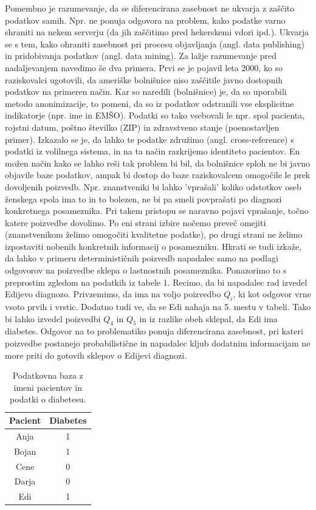 \documentclass[12pt,a4paper]{amsart}
\theoremstyle{definition} %
\theoremstyle{plain} %
\begin{document}
Pomembno je razumevanje, da se diferencirana zasebnost ne ukvarja z zaščito podatkov samih. Npr. ne ponuja odgovora na problem, kako podatke varno shraniti na nekem serverju (da jih zaščitimo pred hekerskemi vdori ipd.). Ukvarja se s tem, kako ohraniti zasebnost pri procesu objavljanja (angl. data publishing) in pridobivanja podatkov (angl. data mining). Za lažje razumevanje pred nadaljevanjem navedimo še dva primera. Prvi se je pojavil leta 2000, ko so raziskovalci ugotovili, da ameriške bolnišnice niso zaščitile javno dostopnih podatkov na primeren način. Kar so naredili (bolnišnice) je, da so uporabili metodo anonimizacije, to pomeni, da so iz podatkov odstranili vse eksplicitne indikatorje (npr. ime in EMŠO). Podatki so tako vsebovali le npr. spol pacienta, rojstni datum, poštno številko (ZIP) in zdravstveno stanje (poenostavljen primer). Izkazalo se je, da lahko te podatke združimo (angl. cross-reference) s podatki iz volilnega sistema, in na ta način razkrijemo identiteto pacientov. En možen način kako se lahko reši tak problem bi bil, da bolnišnice sploh ne bi javno objavile baze podatkov, ampak bi dostop do baze raziskovalcem omogočile le prek dovoljenih poizvedb. Npr. znanstveniki bi lahko 'vprašali' koliko odstotkov oseb ženskega spola ima to in to bolezen, ne bi pa smeli povprašati po diagnozi konkretnega posameznika. Pri takem pristopu se naravno pojavi vprašanje, točno katere poizvedbe dovolimo. Po eni strani izbire nočemo preveč omejiti (znanstvenikom želimo omogočiti kvalitetne podatke), po drugi strani ne želimo izpostaviti nobenih konkretnih informacij o posamezniku. Hkrati se tudi izkaže, da lahko v primeru determinističnih poizvedb napadalec samo na podlagi odgovorov na poizvedbe sklepa o lastnostnih posameznika. Ponazorimo to s preprostim zgledom na podatkih iz tabele 1. Recimo, da bi napadalec rad izvedel Edijevo diagnozo. Privzemimo, da ima na voljo poizvedbo $Q_i$, ki kot odgovor vrne vsoto prvih i vrstic. Dodatno tudi ve, da se Edi nahaja na 5. mestu v tabeli. Tako bi lahko izvedel poizvedbi $Q_4$ in $Q_5$ in iz razlike obeh sklepal, da Edi ima diabetes.  Odgovor na to problematiko ponuja diferencirana zasebnost, pri kateri poizvedbe postanejo probabilistične in napadalec kljub dodatnim informacijam ne more priti do gotovih sklepov o Edijevi diagnozi.
\begin{table}
\begin{center}
 \begin{tabular}{| c | c |} 
 \hline
 \textbf{Pacient} & \textbf{Diabetes}  \\ [0.5ex] 
 \hline
 Anja & 1  \\ 
 \hline
 Bojan & 1\\
 \hline
 Cene & 0 \\
 \hline
 Darja & 0  \\
 \hline
 Edi & 1  \\  
 \hline
\end{tabular}
\caption{Podatkovna baza z imeni pacientov in podatki o diabetesu.}
\end{center}
\end{table}
\end{document}
